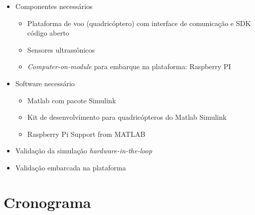 \documentclass{beamer}
\begin{document}
\begin{frame}[allowframebreaks]
\begin{itemize}
	
	\framebreak
	
		\item Componentes necessários
		\begin{itemize}	
			
			\item Plataforma de voo (quadricóptero) com interface de comunicação e SDK código aberto
			
			\item Sensores ultrassônicos
			
			\item \textit{Computer-on-module} para embarque na plataforma: Raspberry PI
				
		\end{itemize}
		
		\item Software necessário
		\begin{itemize}	
			
			\item Matlab com pacote Simulink
			
			\item Kit de desenvolvimento para quadricópteros do Matlab Simulink
			
			\item Raspberry Pi Support from MATLAB
			
		\end{itemize}
	
	\framebreak	
		
%		
%		
	
		
		\item Validação da simulação \textit{hardware-in-the-loop}
		
		\item Validação embarcada na plataforma
		
			
			
	\end{itemize}
	
		 
	
\end{frame}


\section{Cronograma}
\end{document}
